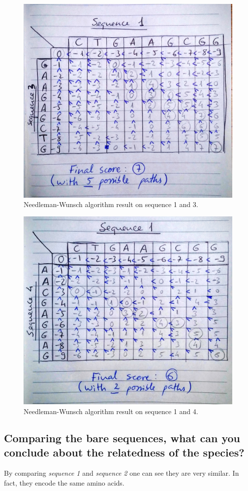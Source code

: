 \begin{figure}[ht]
    \centering
    \includegraphics[width=0.6\linewidth]{res/needleman-wunsch-seq1-seq3.jpg}
    \caption{Needleman-Wunsch algorithm result on sequence 1 and 3.}
    \label{fig:needleman-wunsch-seq1-seq3}
\end{figure}

\begin{figure}[ht]
    \centering
    \includegraphics[width=0.6\linewidth]{res/needleman-wunsch-seq1-seq4.jpg}
    \caption{Needleman-Wunsch algorithm result on sequence 1 and 4.}
    \label{fig:needleman-wunsch-seq1-seq4}
\end{figure}

\clearpage


\subsection{Comparing the bare sequences, what can you conclude about the relatedness of the species?}

By comparing \textit{sequence 1} and \textit{sequence 2} one can see they are very similar. In fact, they encode the same amino acids.

